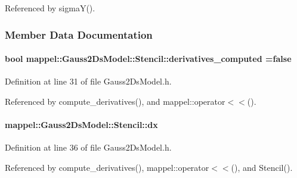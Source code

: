 Referenced by sigma\+Y().



\subsubsection{Member Data Documentation}
\paragraph[{\texorpdfstring{derivatives\+\_\+computed}{derivatives_computed}}]{\setlength{\rightskip}{0pt plus 5cm}bool mappel\+::\+Gauss2\+Ds\+Model\+::\+Stencil\+::derivatives\+\_\+computed =false}\hypertarget{classmappel_1_1Gauss2DsModel_1_1Stencil_a5b850a03436f6e189848d06e8bc1bc67}{}\label{classmappel_1_1Gauss2DsModel_1_1Stencil_a5b850a03436f6e189848d06e8bc1bc67}


Definition at line 31 of file Gauss2\+Ds\+Model.\+h.



Referenced by compute\+\_\+derivatives(), and mappel\+::operator$<$$<$().

\paragraph[{\texorpdfstring{dx}{dx}}]{ mappel\+::\+Gauss2\+Ds\+Model\+::\+Stencil\+::dx}\hypertarget{classmappel_1_1Gauss2DsModel_1_1Stencil_a044c0a62c198349e8d51c6fa36556f31}{}\label{classmappel_1_1Gauss2DsModel_1_1Stencil_a044c0a62c198349e8d51c6fa36556f31}


Definition at line 36 of file Gauss2\+Ds\+Model.\+h.



Referenced by compute\+\_\+derivatives(), mappel\+::operator$<$$<$(), and Stencil().

